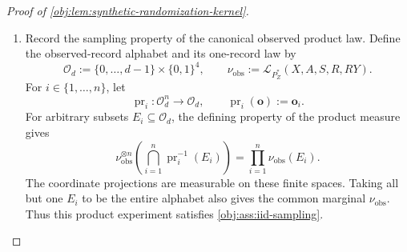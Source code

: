 \documentclass[11pt]{article}
\begin{document}
\begin{proof}[Proof of \cref{obj:lem:synthetic-randomization-kernel}]
\begin{enumerate}
The same calculation gives
\[
P_Z^*(A=a,X=x-1,S=0,R=1)
=\frac{p_x}{2}\beta^{\mathrm{mark}}_{ax},
\qquad
p_{a,x-1,1}(P_Z^*)=0.
\]
Thus an occupied cell has \(S=0\) and \(p_x>0\). By the observational positivity bounds,
\[
\begin{aligned}
\rho_{0,x-1,0}(P_Z^*)&=1-\pi_x\ge q,\\
\rho_{1,x-1,0}(P_Z^*)&=\pi_x\ge q.
\end{aligned}
\]
This establishes \cref{obj:ass:occupied-cell-arrival}. Finally, \(n\ge1\), membership of \(P_Z\) in the observational class supplies \(d\ge1\), and \(0<q<1/2\) implies \(q\le1\). Hence
\[
P_Z^*\in\mathcal M^+_{n,d,q}
\]
by \cref{obj:def:unrestricted-arrival-model-class}.

\item Record the sampling property of the canonical observed product law. Define the observed-record alphabet and its one-record law by
\[
\mathcal O_d:=\{0,\ldots,d-1\}\times\{0,1\}^4,
\qquad
\nu_{\mathrm{obs}}
:=\mathcal L_{P_Z^*}(X,A,S,R,RY).
\]
For \(i\in\{1,\ldots,n\}\), let
\[
\operatorname{pr}_i:\mathcal O_d^n\longrightarrow\mathcal O_d,
\qquad
\operatorname{pr}_i(\mathbf o):=\mathbf o_i.
\]
For arbitrary subsets \(E_i\subseteq\mathcal O_d\), the defining property of the product measure gives
\[
\nu_{\mathrm{obs}}^{\otimes n}
\left(\bigcap_{i=1}^n\operatorname{pr}_i^{-1}(E_i)\right)
=
\prod_{i=1}^n\nu_{\mathrm{obs}}(E_i).
\]
The coordinate projections are measurable on these finite spaces. Taking all but one \(E_i\) to be the entire alphabet also gives the common marginal \(\nu_{\mathrm{obs}}\). Thus this product experiment satisfies \cref{obj:ass:iid-sampling}.


\end{enumerate}
\end{proof}
\end{document}
